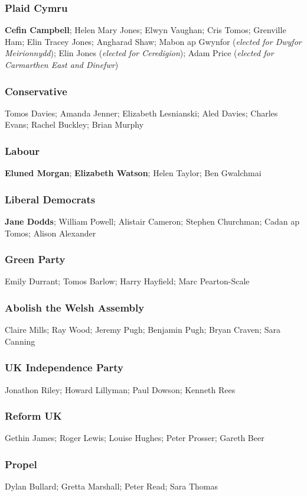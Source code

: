 \begin{resultsiii}
	\subsubsection*{Plaid Cymru}
	\textbf{Cefin Campbell}; Helen Mary Jones; Elwyn Vaughan; Cris Tomos; Grenville Ham; Elin Tracey Jones; Angharad Shaw; Mabon ap Gwynfor (\emph{elected for Dwyfor Meirionnydd}); Elin Jones (\emph{elected for Ceredigion}); Adam Price (\emph{elected for Carmarthen East and Dinefwr})
	\subsubsection*{Conservative}
	Tomos Davies; Amanda Jenner; Elizabeth Lesnianski; Aled Davies; Charles Evans; Rachel Buckley; Brian Murphy
	\subsubsection*{Labour}
	\textbf{Eluned Morgan}; \textbf{Elizabeth Watson}; Helen Taylor; Ben Gwalchmai
	\subsubsection*{Liberal Democrats}
	\textbf{Jane Dodds}; William Powell; Alistair Cameron; Stephen Churchman; Cadan ap Tomos; Alison Alexander
	\subsubsection*{Green Party}
	Emily Durrant; Tomos Barlow; Harry Hayfield; Marc Pearton-Scale
	\subsubsection*{Abolish the Welsh Assembly}
	Claire Mills; Ray Wood; Jeremy Pugh; Benjamin Pugh; Bryan Craven; Sara Canning
	\subsubsection*{UK Independence Party}
	Jonathon Riley; Howard Lillyman; Paul Dowson; Kenneth Rees
	\subsubsection*{Reform UK}
	Gethin James; Roger Lewis; Louise Hughes; Peter Prosser; Gareth Beer
	\subsubsection*{Propel}
	Dylan Bullard; Gretta Marshall; Peter Read; Sara Thomas

\end{resultsiii}
